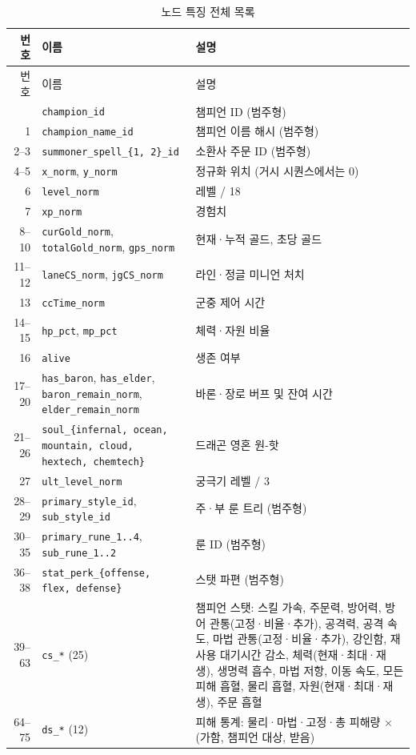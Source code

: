 \begin{longtable}{@{}r>{\raggedright\arraybackslash}p{6.0cm}>{\raggedright\arraybackslash}p{6.7cm}@{}}
  \caption{노드 특징 전체 목록}\label{tab:app-node}\\
  \toprule
  번호 & 이름 & 설명 \\
  \midrule
  \endfirsthead
  \toprule
  번호 & 이름 & 설명 \\
  \midrule
  \endhead
  \bottomrule
  \endfoot
  0 & \texttt{champion\_id} & 챔피언 ID (범주형) \\
  1 & \texttt{champion\_name\_id} & 챔피언 이름 해시 (범주형) \\
  2--3 & \texttt{summoner\_spell\_\{1, 2\}\_id} & 소환사 주문 ID (범주형) \\
  4--5 & \texttt{x\_norm}, \texttt{y\_norm} & 정규화 위치 (거시 시퀀스에서는 0) \\
  6 & \texttt{level\_norm} & 레벨 / 18 \\
  7 & \texttt{xp\_norm} & 경험치 \\
  8--10 & \texttt{curGold\_norm}, \texttt{totalGold\_norm}, \texttt{gps\_norm} & 현재·누적 골드, 초당 골드 \\
  11--12 & \texttt{laneCS\_norm}, \texttt{jgCS\_norm} & 라인·정글 미니언 처치 \\
  13 & \texttt{ccTime\_norm} & 군중 제어 시간 \\
  14--15 & \texttt{hp\_pct}, \texttt{mp\_pct} & 체력·자원 비율 \\
  16 & \texttt{alive} & 생존 여부 \\
  17--20 & \texttt{has\_baron}, \texttt{has\_elder}, \texttt{baron\_remain\_norm}, \texttt{elder\_remain\_norm} & 바론·장로 버프 및 잔여 시간 \\
  21--26 & \texttt{soul\_\{infernal, ocean, mountain, cloud, hextech, chemtech\}} & 드래곤 영혼 원-핫 \\
  27 & \texttt{ult\_level\_norm} & 궁극기 레벨 / 3 \\
  28--29 & \texttt{primary\_style\_id}, \texttt{sub\_style\_id} & 주·부 룬 트리 (범주형) \\
  30--35 & \texttt{primary\_rune\_1..4}, \texttt{sub\_rune\_1..2} & 룬 ID (범주형) \\
  36--38 & \texttt{stat\_perk\_\{offense, flex, defense\}} & 스탯 파편 (범주형) \\
  39--63 & \texttt{cs\_*} (25) & 챔피언 스탯: 스킬 가속, 주문력, 방어력, 방어 관통(고정·비율·추가), 공격력, 공격 속도, 마법 관통(고정·비율·추가), 강인함, 재사용 대기시간 감소, 체력(현재·최대·재생), 생명력 흡수, 마법 저항, 이동 속도, 모든 피해 흡혈, 물리 흡혈, 자원(현재·최대·재생), 주문 흡혈 \\
  64--75 & \texttt{ds\_*} (12) & 피해 통계: 물리·마법·고정·총 피해량 $\times$ (가함, 챔피언 대상, 받음) \\
\end{longtable}
